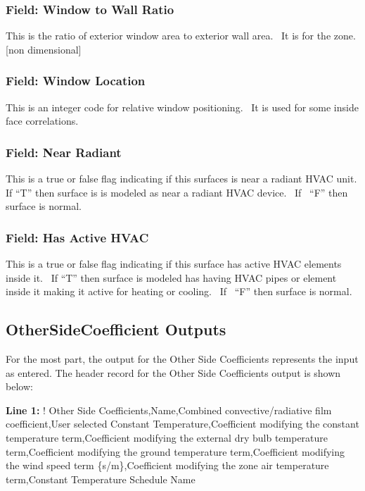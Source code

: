 \subsubsection{Field: Window to Wall Ratio}\label{field-window-to-wall-ratio}

This is the ratio of exterior window area to exterior wall area.~ It is for the zone. {[}non dimensional{]}

\subsubsection{Field: Window Location}\label{field-window-location}

This is an integer code for relative window positioning.~ It is used for some inside face correlations.

\subsubsection{Field: Near Radiant}\label{field-near-radiant}

This is a true or false flag indicating if this surfaces is near a radiant HVAC unit. If ``T'' then surface is is modeled as near a radiant HVAC device.~ If~ ``F'' then surface is normal.

\subsubsection{Field: Has Active HVAC}\label{field-has-active-hvac}

This is a true or false flag indicating if this surface has active HVAC elements inside it.~ If ``T'' then surface is modeled has having HVAC pipes or element inside it making it active for heating or cooling.~ If~ ``F'' then surface is normal.

\subsection{OtherSideCoefficient Outputs}\label{othersidecoefficient-outputs}

For the most part, the output for the Other Side Coefficients represents the input as entered. The header record for the Other Side Coefficients output is shown below:

\textbf{Line 1:} ! Other Side Coefficients,Name,Combined convective/radiative film coefficient,User selected Constant Temperature,Coefficient modifying the constant temperature term,Coefficient modifying the external dry bulb temperature term,Coefficient modifying the ground temperature term,Coefficient modifying the wind speed term \{s/m\},Coefficient modifying the zone air temperature term,Constant Temperature Schedule Name

